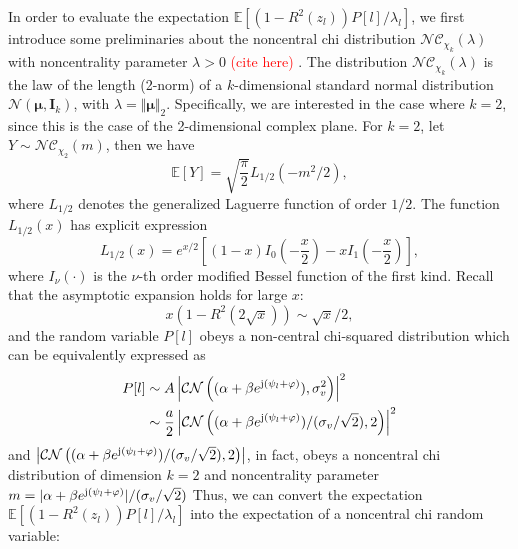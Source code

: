 \documentclass[12pt,draftclsnofoot,journal,onecolumn]{IEEEtran}
\theoremstyle{nonumberplain}
\def \CN {\mathcal{CN}}
\def \nc {\mathcal{NC}}
\def \ch {\textcolor{red}{(cite here) }}
\begin{document}
    In order to evaluate the expectation $\mathbb{E}[(1-R^2(z_l))P[l]/\lambda_l]$, we first introduce some preliminaries about the noncentral chi distribution $\nc_{\chi_k}(\lambda)$ with noncentrality parameter $\lambda>0$ \ch. The distribution $\nc_{\chi_k}(\lambda)$ is the law of the length (2-norm) of a $k$-dimensional standard normal distribution $\mathcal{N}({\bm \mu}, {\bm I}_k)$, with $\lambda = \Vert {\bm \mu} \Vert_2$. Specifically, we are interested in the case where $k=2$, since this is the case of the 2-dimensional complex plane. For  $k=2$, let $Y \sim \nc_{\chi_2}(m)$, then we have \cite{park1961moments}
    \begin{equation}
        \mathbb{E}\left[Y\right] = \sqrt{\frac{\pi}{2}}L_{1/2}(-m^2/2),
        \label{eqn:noncentral chi mean}
    \end{equation}
    where $L_{1/2}$ denotes the generalized Laguerre function  of order $1/2$. The function $L_{1/2}(x)$ has explicit expression 
    \begin{equation}
        L_{1/2}(x) = e^{x/2}\left[(1-x)I_0\left(-\frac{x}{2}\right)-xI_1\left(-\frac{x}{2}\right) \right],
        \label{eqn:Laguerre half order}
    \end{equation}
    where $I_\nu(\cdot)$ is the $\nu$-th order  modified Bessel function of the first kind. Recall that the asymptotic expansion holds for large $x$:
    \begin{equation}
        x(1-R^2(2\sqrt{x})) \sim \sqrt{x}/2,
        \label{eqn:asym_expansion}
    \end{equation}
    and the random variable $P[l]$ obeys a non-central chi-squared distribution which can be equivalently expressed as 
    \begin{equation}
        \begin{aligned}
        P[l] &\sim A\left| \CN\left( (\alpha + \beta e^{{\rm j} (\psi_l + \varphi)}), \sigma_v^2 \right)\right|^2 \\
        &\sim \frac{a}{2} \left| \CN\left((\alpha + \beta e^{{\rm j} (\psi_l + \varphi)})/(\sigma_v / \sqrt{2}), 2\right)\right|^2\\
        \end{aligned}
    \end{equation}
    and $\left| \CN\left((\alpha + \beta e^{{\rm j} (\psi_l + \varphi)})/(\sigma_v / \sqrt{2}), 2\right)\right|$, in fact, obeys a noncentral chi distribution of dimension $k=2$ and noncentrality parameter $m=\lvert\alpha + \beta e^{{\rm j} (\psi_l + \varphi)}\rvert/(\sigma_v / \sqrt{2})$ Thus, we can convert the expectation  $\mathbb{E}[(1-R^2(z_l))P[l]/\lambda_l]$ into the expectation of a noncentral chi random variable:
\end{document}
